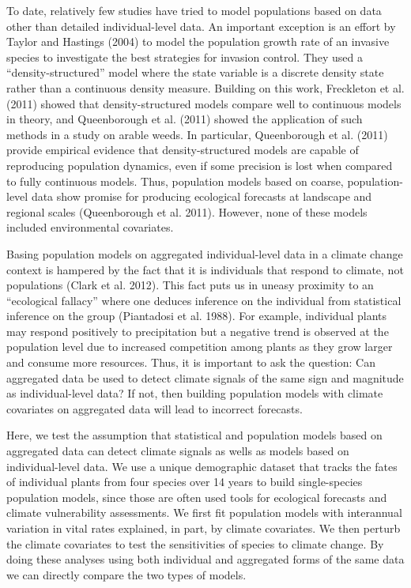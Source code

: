 \documentclass[12pt,]{article}
\begin{document}
To date, relatively few studies have tried to model populations based on
data other than detailed individual-level data. An important exception
is an effort by Taylor and Hastings (2004) to model the population
growth rate of an invasive species to investigate the best strategies
for invasion control. They used a ``density-structured'' model where the
state variable is a discrete density state rather than a continuous
density measure. Building on this work, Freckleton et al. (2011) showed
that density-structured models compare well to continuous models in
theory, and Queenborough et al. (2011) showed the application of such
methods in a study on arable weeds. In particular, Queenborough et al.
(2011) provide empirical evidence that density-structured models are
capable of reproducing population dynamics, even if some precision is
lost when compared to fully continuous models. Thus, population models
based on coarse, population-level data show promise for producing
ecological forecasts at landscape and regional scales (Queenborough et
al. 2011). However, none of these models included environmental
covariates.

Basing population models on aggregated individual-level data in a
climate change context is hampered by the fact that it is individuals
that respond to climate, not populations (Clark et al. 2012). This fact
puts us in uneasy proximity to an ``ecological fallacy'' where one
deduces inference on the individual from statistical inference on the
group (Piantadosi et al. 1988). For example, individual plants may
respond positively to precipitation but a negative trend is observed at
the population level due to increased competition among plants as they
grow larger and consume more resources. Thus, it is important to ask the
question: Can aggregated data be used to detect climate signals of the
same sign and magnitude as individual-level data? If not, then building
population models with climate covariates on aggregated data will lead
to incorrect forecasts.

Here, we test the assumption that statistical and population models
based on aggregated data can detect climate signals as wells as models
based on individual-level data. We use a unique demographic dataset that
tracks the fates of individual plants from four species over 14 years to
build single-species population models, since those are often used tools
for ecological forecasts and climate vulnerability assessments. We first
fit population models with interannual variation in vital rates
explained, in part, by climate covariates. We then perturb the climate
covariates to test the sensitivities of species to climate change. By
doing these analyses using both individual and aggregated forms of the
same data we can directly compare the two types of models.
\end{document}
